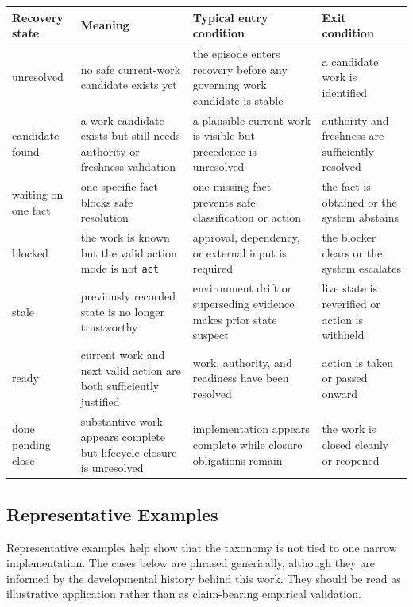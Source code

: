 \documentclass[a4paper,fleqn]{cas-dc}
\begin{document}
\begin{strip}
\captionsetup{type=table}
\label{tab:recovery-states}
\centering
\footnotesize
\setlength{\tabcolsep}{4pt}
\renewcommand{\arraystretch}{1.05}
\begin{tabularx}{\textwidth}{>{\raggedright\arraybackslash}p{} >{\raggedright\arraybackslash}p{} >{\raggedright\arraybackslash}p{} X}
\toprule
Recovery state & Meaning & Typical entry condition & Exit condition \\
\midrule
unresolved & no safe current-work candidate exists yet & the episode enters recovery before any governing work candidate is stable & a candidate work is identified \\
candidate found & a work candidate exists but still needs authority or freshness validation & a plausible current work is visible but precedence is unresolved & authority and freshness are sufficiently resolved \\
waiting on one fact & one specific fact blocks safe resolution & one missing fact prevents safe classification or action & the fact is obtained or the system abstains \\
blocked & the work is known but the valid action mode is not \texttt{act} & approval, dependency, or external input is required & the blocker clears or the system escalates \\
stale & previously recorded state is no longer trustworthy & environment drift or superseding evidence makes prior state suspect & live state is reverified or action is withheld \\
ready & current work and next valid action are both sufficiently justified & work, authority, and readiness have been resolved & action is taken or passed onward \\
done pending close & substantive work appears complete but lifecycle closure is unresolved & implementation appears complete while closure obligations remain & the work is closed cleanly or reopened \\
\bottomrule
\end{tabularx}
\end{strip}

\subsection{Representative Examples}

Representative examples help show that the taxonomy is not tied to one narrow implementation. The cases below are phrased generically, although they are informed by the developmental history behind this work. They should be read as illustrative application rather than as claim-bearing empirical validation.
\end{document}
